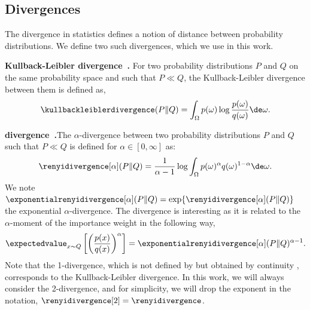 \subsection{Divergences}
The divergence in statistics defines a notion of distance between probability distributions. 
We define two such divergences, which we use in this work.

\noindent\textbf{Kullback-Leibler divergence~\cite[Section~2.3]{cover1991information}.}\indent 
For two probability distributions $P$ and $Q$ on the same probability space and such that $P \ll Q$, the Kullback-Leibler divergence between them is defined as,
\begin{align*}
    \kullbackleiblerdivergence(P\Vert Q)=\int_{\Omega} p(\omega) \log \frac{p(\omega)}{q(\omega)} \de \omega.
\end{align*}

\noindent\textbf{\Renyi divergence~\cite{renyi1961measures}.}\indent The $\alpha$-\Renyi divergence between two probability distributions $P$ and $Q$ such that $P \ll Q$ is defined for $\alpha \in [0,\infty]$ as:
\begin{align}
\label{eq:renyi_div}
	\renyidivergence[\alpha](P\Vert Q) = \frac{1}{\alpha-1}\log \int_{\Omega} p(\omega)^\alpha q(\omega)^{1-\alpha} \de \omega.
\end{align}
We note $\exponentialrenyidivergence[\alpha](P\Vert Q) = \exp\{\renyidivergence[\alpha](P\Vert Q)\}$ the exponential $\alpha$-\Renyi divergence.
The \Renyi divergence is interesting as it is related to the $\alpha$-moment of the importance weight in the following way,
\begin{align*}
    \expectedvalue_{x\sim Q}\left[\left(\frac{p(x)}{q(x)}\right)^{\alpha}\right] = \exponentialrenyidivergence[\alpha](P\Vert Q)^{\alpha-1}.
\end{align*}
Note that the 1-\Renyi divergence, which is not defined by  but obtained by continuity \cite{van2014renyi}, corresponds to the Kullback-Leibler divergence.
In this work, we will always consider the 2-\Renyi divergence, and for simplicity, we will drop the exponent in the notation, $\renyidivergence[2]=\renyidivergence$.




